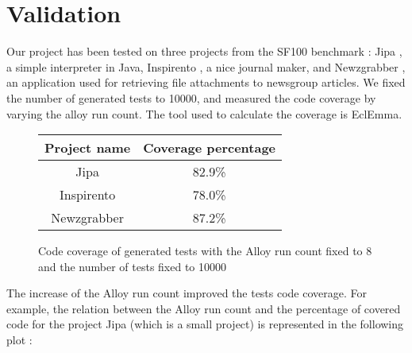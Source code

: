 \section{Validation}
\label{sec:Validation}
	Our project has been tested on three projects from the SF100 benchmark \cite{sf100} : Jipa \cite{jipa}, a simple interpreter in Java, Inspirento \cite{inspirento}, a nice journal maker, and Newzgrabber \cite{newzgrabber}, an application used for retrieving file attachments to newsgroup articles. We fixed the number of generated tests to 10000, and measured the code coverage by varying the alloy run count. The tool used to calculate the coverage is EclEmma.\cite{eclemma}\\
	
\begin{figure}[!h]
\begin{center}
\begin{tabular}{|c|c|}

 \hline
 \textbf{Project name} & \textbf{Coverage percentage}\\
 \hline
 Jipa & 82.9\%\\ 
 \hline
 Inspirento & 78.0\%\\
 \hline
 Newzgrabber & 87.2\%\\

 \hline
\end{tabular}
\caption{Code coverage of generated tests with the Alloy run count fixed to 8 and the number of tests fixed to 10000}
\end{center}
\end{figure}

The increase of the Alloy run count improved the tests code coverage. For example, the relation between the Alloy run count and the percentage of covered code for the project Jipa (which is a small project) is represented in the following plot :\\

\pgfplotsset{width=\textwidth,compat=1.9}

{\setlength{\parindent}{0cm}
}